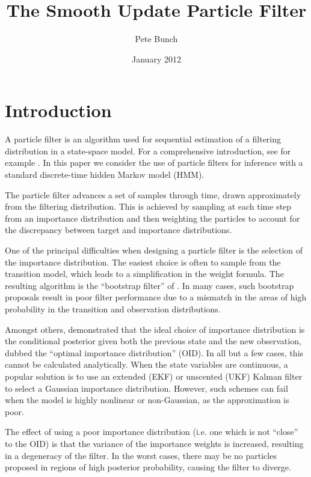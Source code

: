 \documentclass{article}
\title{The Smooth Update Particle Filter}
\author{Pete Bunch}
\date{January 2012}
\begin{document}
\maketitle

\section{Introduction}

A particle filter is an algorithm used for sequential estimation of a filtering distribution in a state-space model. For a comprehensive introduction, see for example \cite{Cappe2007,Doucet2009}. In this paper we consider the use of particle filters for inference with a standard discrete-time hidden Markov model (HMM).

The particle filter advances a set of samples through time, drawn approximately from the filtering distribution. This is achieved by sampling at each time step from an importance distribution and then weighting the particles to account for the discrepancy between target and importance distributions.

One of the principal difficulties when designing a particle filter is the selection of the importance distribution. The easiest choice is often to sample from the transition model, which leads to a simplification in the weight formula. The resulting algorithm is the ``bootstrap filter'' of \cite{Gordon1993}. In many cases, such bootstrap proposals result in poor filter performance due to a mismatch in the areas of high probability in the transition and observation distributions.

Amongst others, \cite{Doucet2000a} demonstrated that the ideal choice of importance distribution is the conditional posterior given both the previous state and the new observation, dubbed the ``optimal importance distribution'' (OID). In all but a few cases, this cannot be calculated analytically. When the state variables are continuous, a popular solution is to use an extended (EKF) or unscented (UKF) Kalman filter to select a Gaussian importance distribution. However, such schemes can fail when the model is highly nonlinear or non-Gaussian, as the approximation is poor.

The effect of using a poor importance distribution (i.e. one which is not ``close'' to the OID) is that the variance of the importance weights is increased, resulting in a degeneracy of the filter. In the worst cases, there may be no particles proposed in regions of high posterior probability, causing the filter to diverge.
\end{document}
